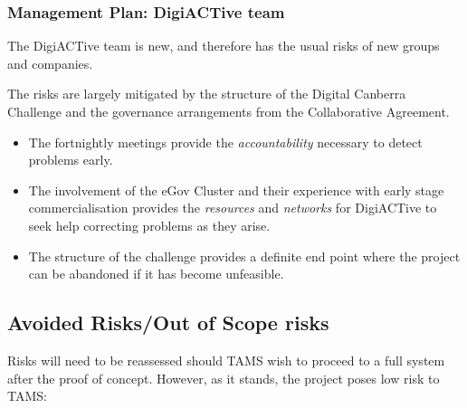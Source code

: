\documentclass[12pt,a4paper,twosided]{article}
\begin{document}
\subsubsection{Management Plan: DigiACTive
team}\label{management-plan-digiactive-team}

The DigiACTive team is new, and therefore has the usual risks of new
groups and companies.

The risks are largely mitigated by the structure of the Digital Canberra
Challenge and the governance arrangements from the Collaborative
Agreement.

\begin{itemize}
\itemsep1pt\parskip0pt
\item
  The fortnightly meetings provide the \emph{accountability} necessary
  to detect problems early.
\item
  The involvement of the eGov Cluster and their experience with early
  stage commercialisation provides the \emph{resources} and
  \emph{networks} for DigiACTive to seek help correcting problems as
  they arise.
\item
  The structure of the challenge provides a definite end point where the
  project can be abandoned if it has become unfeasible.
\end{itemize}

\subsection{Avoided Risks/Out of Scope
risks}\label{avoided-risksout-of-scope-risks}

Risks will need to be reassessed should TAMS wish to proceed to a full
system after the proof of concept. However, as it stands, the project
poses low risk to TAMS:
\end{document}
